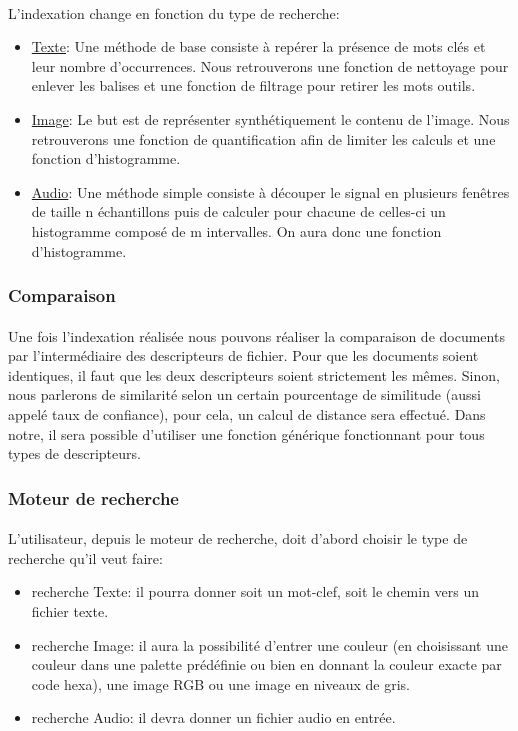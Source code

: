 \documentclass[../main.tex]{subfiles}
\begin{document}
    \paragraph{}
    \noindent L’indexation change en fonction du type de recherche:
    \begin{itemize}
        \item \underline{Texte}: Une méthode de base consiste à repérer la présence de mots clés et leur nombre d'occurrences. Nous retrouverons une fonction de nettoyage pour enlever les balises et une fonction de filtrage pour retirer les mots outils.
        \item \underline{Image}: Le but est de représenter synthétiquement le contenu de l’image. Nous retrouverons une fonction de quantification afin de limiter les calculs et une fonction d’histogramme.
        \item \underline{Audio}: Une méthode simple consiste à découper le signal en plusieurs fenêtres de taille n échantillons puis de calculer pour chacune de celles-ci un histogramme composé de m intervalles. On aura donc une fonction d’histogramme.
    \end{itemize}

    \subsubsection{Comparaison}
    \paragraph{}
    Une fois l’indexation réalisée nous pouvons réaliser la comparaison de documents par l'intermédiaire des descripteurs de fichier. Pour que les documents soient identiques, il faut que les deux descripteurs soient strictement les mêmes. Sinon, nous parlerons de similarité selon un certain pourcentage de similitude (aussi appelé taux de confiance), pour cela, un calcul de distance sera effectué. Dans notre, il sera possible d’utiliser une fonction générique fonctionnant pour tous types de descripteurs.

    \subsubsection{Moteur de recherche}
    \paragraph{}
    L’utilisateur, depuis le moteur de recherche, doit d’abord choisir le type de recherche qu’il veut faire:
    \begin{itemize}
        \item recherche Texte: il pourra donner soit un mot-clef, soit le chemin vers un fichier texte.
        \item recherche Image: il aura la possibilité d’entrer une couleur (en choisissant une couleur dans une palette prédéfinie ou bien en donnant la couleur exacte par code hexa), une image RGB ou une image en niveaux de gris.
        \item recherche Audio: il devra donner un fichier audio en entrée.
    \end{itemize}
\end{document}
